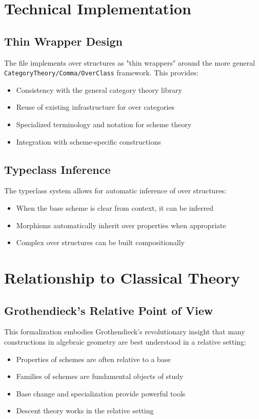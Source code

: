 \documentclass{article}
\theoremstyle{definition}
\begin{document}
\section{Technical Implementation}

\subsection{Thin Wrapper Design}

The file implements over structures as "thin wrappers" around the more general \texttt{CategoryTheory/Comma/OverClass} framework. This provides:
\begin{itemize}
\item Consistency with the general category theory library
\item Reuse of existing infrastructure for over categories
\item Specialized terminology and notation for scheme theory
\item Integration with scheme-specific constructions
\end{itemize}

\subsection{Typeclass Inference}

The typeclass system allows for automatic inference of over structures:
\begin{itemize}
\item When the base scheme is clear from context, it can be inferred
\item Morphisms automatically inherit over properties when appropriate
\item Complex over structures can be built compositionally
\end{itemize}

\section{Relationship to Classical Theory}

\subsection{Grothendieck's Relative Point of View}

This formalization embodies Grothendieck's revolutionary insight that many constructions in algebraic geometry are best understood in a relative setting:
\begin{itemize}
\item Properties of schemes are often relative to a base
\item Families of schemes are fundamental objects of study
\item Base change and specialization provide powerful tools
\item Descent theory works in the relative setting
\end{itemize}
\end{document}
